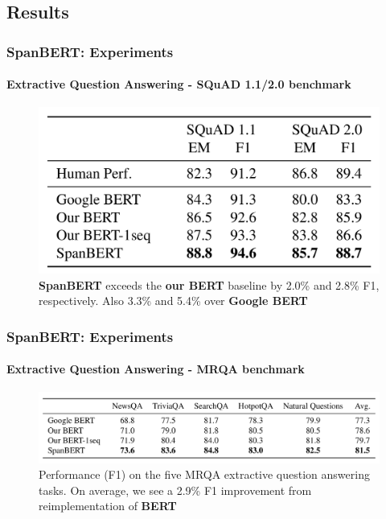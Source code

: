 \documentclass[12pt]{beamer}
\begin{document}
	\subsection{Results}
	\begin{frame}
		\frametitle{SpanBERT: Experiments}
		\framesubtitle{Extractive Question Answering - SQuAD 1.1/2.0 benchmark}
		
		\begin{figure}
			\centering
			\includegraphics[width=\textwidth]{qa1.png}
			\caption{\textbf{SpanBERT} exceeds the \textbf{our BERT} baseline by 2.0\% and 2.8\% F1, respectively. Also 3.3\% and 5.4\% over \textbf{Google BERT}}
		\end{figure}
		
	\end{frame}	
	
	\begin{frame}
		\frametitle{SpanBERT: Experiments}
		\framesubtitle{Extractive Question Answering - MRQA benchmark}
		
		\begin{figure}
			\centering
			\includegraphics[width=\textwidth]{qa2.png}
			\caption{Performance (F1) on the five MRQA extractive question answering tasks. On average, we see a 2.9\% F1 improvement from reimplementation of \textbf{BERT}}
		\end{figure}
		
	\end{frame}	
	
\end{document}
